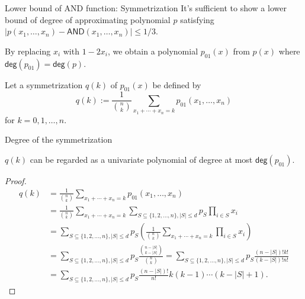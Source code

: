 \documentclass{beamer}
\newcommand\emm[1]{\textcolor{redorange}{{#1}}}
\begin{document}
\begin{frame}{Lower bound of AND function: Symmetrization}
It's sufficient to show a lower bound of degree of approximating polynomial $p$ satisfying $|p(x_1,\dotsc,x_n) - \mathsf{AND}(x_1,\dotsc,x_n)| \le 1/3$.

\vspace{1em}
By replacing $x_i$ with $1-2x_i$, we obtain a polynomial $p_{01}(x)$ from $p(x)$ where $\mathsf{deg}(p_{01}) = \mathsf{deg}(p)$.

\vspace{1em}
Let a \emm{symmetrization} $q(k)$ of $p_{01}(x)$ be defined by
\begin{equation*}
q(k) := \frac1{\binom{n}{k}}\sum_{x_1+\dotsb+x_n = k} p_{01}(x_1,\dotsc,x_n)
\end{equation*}
for $k=0,1,\dotsc,n$.

\end{frame}

\begin{frame}{Degree of the symmetrization}
\begin{theorem}
$q(k)$ can be regarded as a univariate polynomial of degree at most $\mathsf{deg}(p_{01})$.
\end{theorem}
\begin{proof}
\small
\vspace{-2em}
\begin{align*}
q(k) &= \frac1{\binom{n}{k}}\sum_{x_1+\dotsb+x_n = k} p_{01}(x_1,\dotsc,x_n)\\
&= \frac1{\binom{n}{k}}\sum_{x_1+\dotsb+x_n = k} \sum_{S\subseteq\{1,2,\dotsc,n\}, |S|\le d} p_S \prod_{i\in S} x_i\\
&= \sum_{S\subseteq\{1,2,\dotsc,n\}, |S|\le d} p_S \left(\frac1{\binom{n}{k}}\sum_{x_1+\dotsb+x_n = k}  \prod_{i\in S} x_i\right)\\
&= \sum_{S\subseteq\{1,2,\dotsc,n\}, |S|\le d} p_S \frac{\binom{n-|S|}{k-|S|}}{\binom{n}{k}}
= \sum_{S\subseteq\{1,2,\dotsc,n\}, |S|\le d} p_S \frac{(n-|S|)! k! }{(k-|S|)!n!}\\
&= \sum_{S\subseteq\{1,2,\dotsc,n\}, |S|\le d} p_S \frac{(n-|S|)!}{n!} k(k-1)\dotsm(k-|S|+1).
\end{align*}
\end{proof}
\end{frame}
\end{document}
